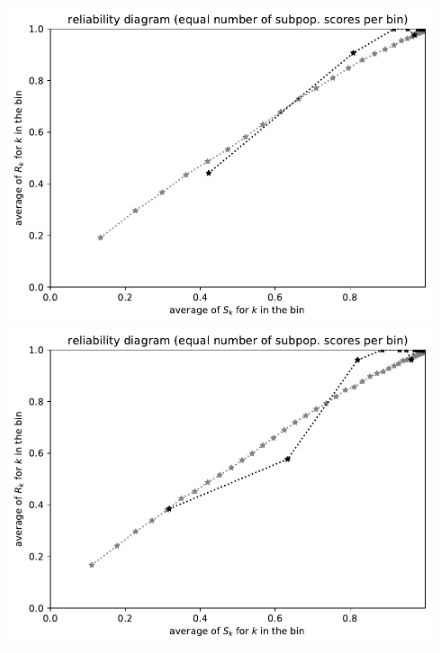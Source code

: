\documentclass{article}
\begin{document}
\begin{figure}
\begin{centering}
\parbox{\imsize}{\includegraphics[width=\imsize]
{./codes/unweighted/prob-1-323-monarch-monarch-butterfly-milkweed-butterfly-Danaus-plexippusequisamps30}}
\quad\quad
\parbox{\imsize}{\includegraphics[width=\imsize]
{./codes/unweighted/prob-1-323-monarch-monarch-butterfly-milkweed-butterfly-Danaus-plexippusequisamps50}}

\vspace{\vertsep}


\end{centering}
\end{figure}
\end{document}
